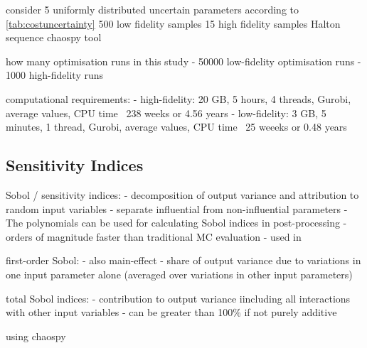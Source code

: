 consider 5 uniformly distributed uncertain parameters according to \cref{tab:costuncertainty}
500 low fidelity samples
15 high fidelity samples
Halton sequence
chaospy tool \cite{feinberg_chaospy_2015}

how many optimisation runs in this study
- 50000 low-fidelity optimisation runs
- 1000 high-fidelity runs

computational requirements:
- high-fidelity: 20 GB, 5 hours, 4 threads, Gurobi, average values, CPU time ~238 weeks or 4.56 years
- low-fidelity: 3 GB, 5 minutes, 1 thread, Gurobi, average values, CPU time ~25 weeeks or 0.48 years

\subsection{Sensitivity Indices}
\label{sec:sobol}

Sobol / sensitivity indices:
- decomposition of output variance and attribution to random input variables
- separate influential from non-influential parameters
- The polynomials can be used for calculating Sobol indices in post-processing
- orders of magnitude faster than traditional MC evaluation \cite{sudret_global_2008}
- used in \cite{trondle_trade-offs_2020,mavromatidis_uncertainty_2018}

first-order Sobol:
- also main-effect
- share of output variance due to variations in one input parameter alone (averaged over variations in other input parameters)

total Sobol indices:
- contribution to output variance iincluding all interactions with other input variables
- can be greater than 100\% if not purely additive

using chaospy \cite{feinberg_chaospy_2015}
